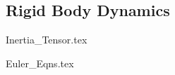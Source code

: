 \documentclass[class=report, 12pt, crop=false]{standalone}
\begin{document}
\begin{center}
\chapter{Rigid Body Dynamics}
\begin{comment}
\end{comment}
{Inertia_Tensor.tex}
\begin{comment}
Start Level: Sections
End Level: Sections
Aditional Comments:
Kinematic Transport Theorem
\end{comment}
{Euler_Eqns.tex}
\begin{comment}
Start Level: Sections
End Level: Sections
Aditional Comments:
Kinematic Transport Theorem
\end{comment}
\end{center}
\end{document}
